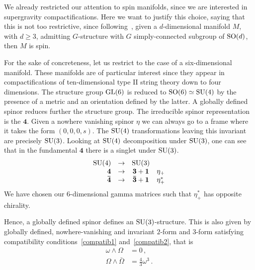 \documentclass[debug]{phd}
\begin{document}
				We already restricted our attention to spin manifolds, since we are interested in supergravity compactifications.
				Here we want to justify this choice, saying that this is not too restrictive, since following~\cite[prop. 3.6.2]{joyce}, given a $d$-dimensional manifold $M$, with $d \geq 3$, admitting $G$-structure with $G$ simply-connected subgroup of $\mathrm{SO}(d)$, then $M$ is spin.
				
				For the sake of concreteness, let us restrict to the case of a six-dimensional manifold. 
				These manifolds are of particular interest since they appear in compactifications of ten-dimensional type II string theory down to four dimensions.
				The structure group $\mathrm{GL}(6)$ is reduced to $\mathrm{SO}(6) \simeq \mathrm{SU}(4)$ by the presence of a metric and an orientation defined by the latter.
				A globally defined spinor reduces further the structure group. The irreducible spinor representation is the $\mathbf{4}$. 
				Given a nowhere vanishing spinor $\eta$ we can always go to a frame where it takes the form $\left(0,0,0,s\right)$. 
				The $\mathrm{SU}(4)$ transformations leaving this invariant are precisely $\mathrm{SU}(3)$.
				Looking at $\mathrm{SU}(4)$ decomposition under $\mathrm{SU}(3)$, one can see that in the fundamental $\mathbf{4}$ there is a singlet under $\mathrm{SU}(3)$.
						\begin{equation*}
							\begin{array}{rccr}
								\mathrm{SU}(4) 			&	\rightarrow	&	\mathrm{SU}(3)					&					\\
								\mathbf{4}			&	\rightarrow	&	\mathbf{3} + \mathbf{1}		&	\eta_+			\\
								\mathbf{\bar{4}}		&	\rightarrow	&	\mathbf{\bar{3}} + \mathbf{1}	&	\eta_+^*					
							\end{array}
						\end{equation*}
				We have chosen our $6$-dimensional gamma matrices such that $\eta_+^*$ has opposite chirality.
				
				Hence, a globally defined spinor defines an $\mathrm{SU}(3)$-structure.
				This is also given by globally defined, nowhere-vanishing and invariant $2$-form and $3$-form satisfying compatibility conditions~\eqref{compatib1} and~\eqref{compatib2}, that is
						\begin{align*}
							\omega \wedge \Omega &= 0\, , \\
							\Omega \wedge \bar{\Omega} &= \frac{4}{3} \omega^3\, .
						\end{align*}
				
\end{document}
